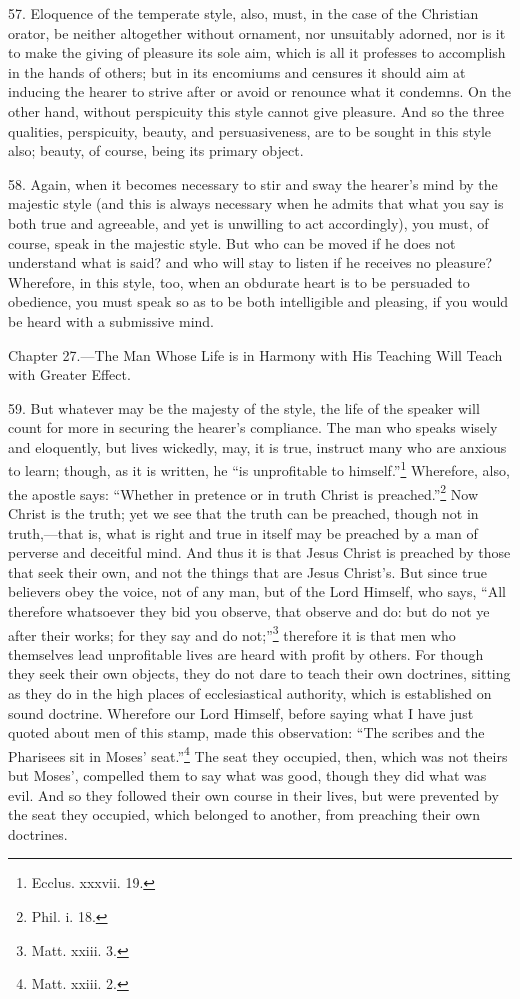 57. Eloquence of the temperate style, also, must, in the case of the Christian orator, be neither altogether without ornament, nor unsuitably adorned, nor is it to make the giving of pleasure its sole aim, which is all it professes to accomplish in the hands of others; but in its encomiums and censures it should aim at inducing the hearer to strive after or avoid or renounce what it condemns. On the other hand, without perspicuity this style cannot give pleasure. And so the three qualities, perspicuity, beauty, and persuasiveness, are to be sought in this style also; beauty, of course, being its primary object.

58. Again, when it becomes necessary to stir and sway the hearer’s mind by the majestic style (and this is always necessary when he admits that what you say is both true and agreeable, and yet is unwilling to act accordingly), you must, of course, speak in the majestic style. But who can be moved if he does not understand what is said? and who will stay to listen if he receives no pleasure? Wherefore, in this style, too, when an obdurate heart is to be persuaded to obedience, you must speak so as to be both intelligible and pleasing, if you would be heard with a submissive mind.


Chapter 27.—The Man Whose Life is in Harmony with His Teaching Will Teach with Greater Effect.

59. But whatever may be the majesty of the style, the life of the speaker will count for more in securing the hearer’s compliance. The man who speaks wisely and eloquently, but lives wickedly, may, it is true, instruct many who are anxious to learn; though, as it is written, he “is unprofitable to himself.”\footnote{Ecclus. xxxvii. 19.} Wherefore, also, the apostle says: “Whether in pretence or in truth Christ is preached.”\footnote{Phil. i. 18.} Now Christ is the truth; yet we see that the truth can be preached, though not in truth,—that is, what is right and true in itself may be preached by a man of perverse and deceitful mind. And thus it is that Jesus Christ is preached by those that seek their own, and not the things that are Jesus Christ’s. But since true believers obey the voice, not of any man, but of the Lord Himself, who says, “All therefore whatsoever they bid you observe, that observe and do: but do not ye after their works; for they say and do not;”\footnote{Matt. xxiii. 3.} therefore it is that men who themselves lead unprofitable lives are heard with profit by others. For though they seek their own objects, they do not dare to teach their own doctrines, sitting as they do in the high places of ecclesiastical authority, which is established on sound doctrine. Wherefore our Lord Himself, before saying what I have just quoted about men of this stamp, made this observation: “The scribes and the Pharisees sit in Moses’ seat.”\footnote{Matt. xxiii. 2.} The seat they occupied, then, which was not theirs but Moses’, compelled them to say what was good, though they did what was evil. And so they followed their own course in their lives, but were prevented by the seat they occupied, which belonged to another, from preaching their own doctrines.

